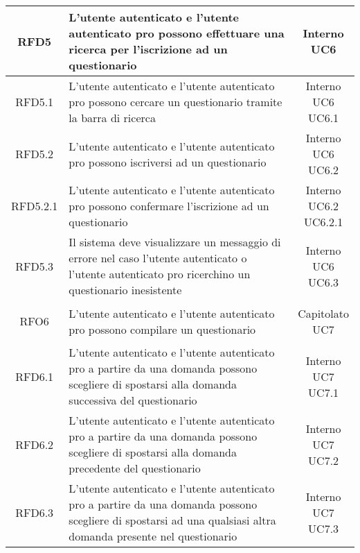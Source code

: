 \begin{longtable}{|c|>{\centering}m{7cm}|c|}
			 \hypertarget{{RFD5}}{{RFD5}} & L’utente autenticato e l’utente autenticato pro possono effettuare una ricerca per l’iscrizione ad un questionario & \makecell{Interno\\ UC6 } \\ \hline
			 \hypertarget{{RFD5.1}}{{RFD5.1}} & L’utente autenticato e l’utente autenticato pro possono cercare un questionario tramite la barra di ricerca & \makecell{Interno\\ UC6 \\UC6.1 } \\ \hline
			 \hypertarget{{RFD5.2}}{{RFD5.2}} & L’utente autenticato e l’utente autenticato pro possono iscriversi ad un questionario & \makecell{Interno\\ UC6 \\UC6.2 } \\ \hline
			 \hypertarget{{RFD5.2.1}}{{RFD5.2.1}} & L’utente autenticato e l’utente autenticato pro possono confermare l’iscrizione ad un questionario & \makecell{Interno\\ UC6.2 \\UC6.2.1 } \\ \hline
			 \hypertarget{{RFD5.3}}{{RFD5.3}} & Il sistema deve visualizzare un messaggio di errore nel caso l’utente autenticato o l’utente autenticato pro ricerchino un questionario inesistente  & \makecell{Interno\\ UC6 \\UC6.3 } \\ \hline
			 \hypertarget{{RFO6}}{{RFO6}} & L’utente autenticato e l’utente autenticato pro possono compilare un questionario & \makecell{Capitolato\\ UC7 } \\ \hline
			 \hypertarget{{RFD6.1}}{{RFD6.1}} & L’utente autenticato e l’utente autenticato pro a partire da una domanda possono scegliere di spostarsi alla domanda successiva del questionario  & \makecell{Interno\\ UC7 \\UC7.1 } \\ \hline
			 \hypertarget{{RFD6.2}}{{RFD6.2}} & L’utente autenticato e l’utente autenticato pro a partire da una domanda possono scegliere di spostarsi alla domanda precedente del questionario & \makecell{Interno\\ UC7 \\UC7.2 } \\ \hline
			 \hypertarget{{RFD6.3}}{{RFD6.3}} & L’utente autenticato e l’utente autenticato pro a partire da una domanda possono scegliere di spostarsi ad una qualsiasi altra domanda presente nel questionario & \makecell{Interno\\ UC7 \\UC7.3 } \\ \hline

\end{longtable}
